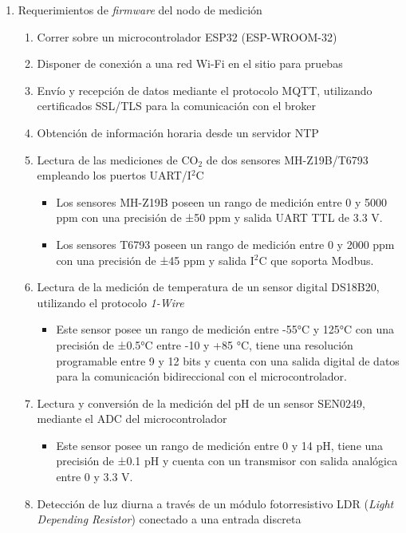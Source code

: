 \documentclass[
11pt, %
]{charter}
\begin{document}
\begin{enumerate}
	\item Requerimientos de \textit{firmware} del nodo de medición
		\begin{enumerate}
                \item Correr sobre un microcontrolador ESP32 (ESP-WROOM-32)
			\item Disponer de conexión a una red Wi-Fi en el sitio para pruebas
			\item Envío y recepción de datos mediante el protocolo MQTT, utilizando certificados SSL/TLS para la comunicación con el broker
			\item Obtención de información horaria desde un servidor NTP
			\item Lectura de las mediciones de CO$_2$ de dos sensores MH-Z19B/T6793 empleando los puertos UART/I$^2$C
               \begin{itemize}
                   \item Los sensores MH-Z19B poseen un rango de medición entre 0 y 5000 ppm con una precisión de ±50 ppm y salida UART TTL de 3.3 V.
                   \item Los sensores T6793 poseen un rango de medición entre 0 y 2000 ppm con una precisión de ±45 ppm y salida I$^2$C que soporta Modbus.
               \end{itemize}
			\item Lectura de la medición de temperatura de un sensor digital DS18B20, utilizando el protocolo \textit{1-Wire}
                \begin{itemize}
                   \item Este sensor posee un rango de medición entre -55°C y 125°C con una precisión de ±0.5°C entre -10 y +85 °C, tiene una resolución programable entre 9 y 12 bits y cuenta con una salida digital de datos para la comunicación bidireccional con el microcontrolador.
               \end{itemize}
			\item Lectura y conversión de la medición del pH de un sensor SEN0249, mediante el ADC del microcontrolador
                \begin{itemize}
                   \item Este sensor posee un rango de medición entre 0 y 14 pH, tiene una precisión de ±0.1 pH y cuenta con un transmisor con salida analógica entre 0 y 3.3 V.
               \end{itemize}
			\item Detección de luz diurna a través de un módulo fotorresistivo LDR (\textit{Light Depending Resistor}) conectado a una entrada discreta

\end{enumerate}
\end{enumerate}
\end{document}
